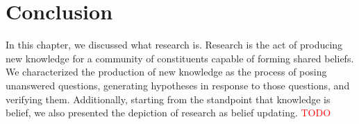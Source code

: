 


\section{Conclusion}
In this chapter, we discussed what research is. Research is the act of producing new knowledge for a community of constituents capable of forming shared beliefs. We characterized the production of new knowledge as the process of posing unanswered questions, generating hypotheses in response to those questions, and verifying them. Additionally, starting from the standpoint that knowledge is belief, we also presented the depiction of research as belief updating.
\textcolor{red}{TODO}